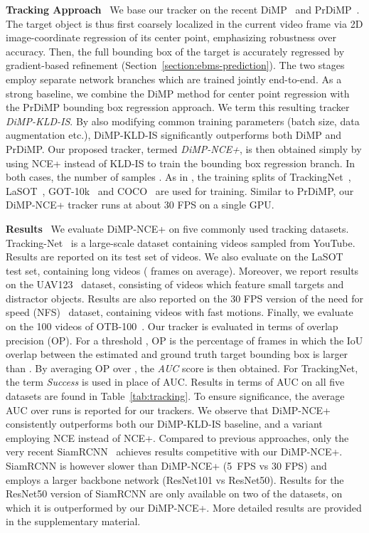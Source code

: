 \documentclass{bmvc2k}
\newcommand{\parsection}[1]{\vspace{2mm}\noindent\textbf{#1}~ }
\begin{document}
\parsection{Tracking Approach}
We base our tracker on the recent DiMP~\cite{bhat2019learning} and PrDiMP~\cite{danelljan2020probabilistic}. The target object is thus first coarsely localized in the current video frame via 2D image-coordinate regression of its center point, emphasizing robustness over accuracy. Then, the full bounding box  of the target is accurately regressed by gradient-based refinement (Section~\ref{section:ebms-prediction}). The two stages employ separate network branches which are trained jointly end-to-end. As a strong baseline, we combine the DiMP method for center point regression with the PrDiMP bounding box regression approach. We term this resulting tracker \textit{DiMP-KLD-IS}. By also modifying common training parameters (batch size, data augmentation etc.), DiMP-KLD-IS significantly outperforms both DiMP and PrDiMP. Our proposed tracker, termed \textit{DiMP-NCE+}, is then obtained simply by using NCE+ instead of KLD-IS to train the bounding box regression branch. In both cases, the number of samples . As in \cite{bhat2019learning, danelljan2020probabilistic}, the training splits of TrackingNet~\cite{muller2018trackingnet}, LaSOT~\cite{fan2019lasot}, GOT-10k~\cite{huang2019got} and COCO~\cite{lin2014microsoft} are used for training. Similar to PrDiMP, our DiMP-NCE+ tracker runs at about 30 FPS on a single GPU.





\parsection{Results}
We evaluate DiMP-NCE+ on five commonly used tracking datasets. Tracking-Net~\cite{muller2018trackingnet} is a large-scale dataset containing videos sampled from YouTube. Results are reported on its test set of  videos. We also evaluate on the LaSOT~\cite{fan2019lasot} test set, containing  long videos ( frames on average). Moreover, we report results on the UAV123~\cite{UAV123} dataset, consisting of  videos which feature small targets and distractor objects. Results are also reported on the 30 FPS version of the need for speed (NFS)~\cite{NFS} dataset, containing  videos with fast motions. Finally, we evaluate on the 100 videos of OTB-100~\cite{OTB100}. Our tracker is evaluated in terms of overlap precision (OP). For a threshold , OP is the percentage of frames in which the IoU overlap between the estimated and ground truth target bounding box is larger than . By averaging OP over , the \textit{AUC} score is then obtained. For TrackingNet, the term \textit{Success} is used in place of AUC. Results in terms of AUC on all five datasets are found in Table~\ref{tab:tracking}. To ensure significance, the average AUC over  runs is reported for our trackers. We observe that DiMP-NCE+ consistently outperforms both our DiMP-KLD-IS baseline, and a variant employing NCE instead of NCE+. Compared to previous approaches, only the very recent SiamRCNN~\cite{voigtlaender2020siam} achieves results competitive with our DiMP-NCE+. SiamRCNN is however slower than DiMP-NCE+ (5~FPS vs 30 FPS) and employs a larger backbone network (ResNet101 vs ResNet50). Results for the ResNet50 version of SiamRCNN are only available on two of the datasets, on which it is outperformed by our DiMP-NCE+. More detailed results are provided in the supplementary material.
\end{document}
